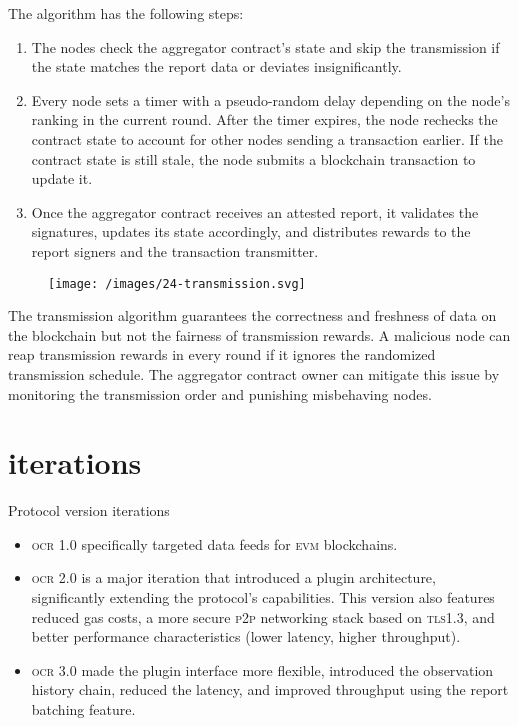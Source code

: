 \documentclass{article}
\begin{document}
The algorithm has the following steps:
\begin{enumerate}
    \item The nodes check the aggregator contract's state and skip the transmission if the state matches the report data or deviates insignificantly.
    \item Every node sets a timer with a pseudo-random delay depending on the node's ranking in the current round.
    After the timer expires, the node rechecks the contract state to account for other nodes sending a transaction earlier.
    If the contract state is still stale, the node submits a blockchain transaction to update it.
    \item Once the aggregator contract receives an attested report, it validates the signatures, updates its state accordingly, and distributes rewards to the report signers and the transaction transmitter.
\end{enumerate}
\begin{figure}[grayscale-diagram,medium-size]
\texttt{[image: /images/24-transmission.svg]}
\end{figure}

The transmission algorithm guarantees the correctness and freshness of data on the blockchain but not the fairness of transmission rewards.
A malicious node can reap transmission rewards in every round if it ignores the randomized transmission schedule.
The aggregator contract owner can mitigate this issue by monitoring the transmission order and punishing misbehaving nodes.

\section{iterations}{Protocol version iterations}
\begin{itemize}
    \item \textsc{ocr 1.0} specifically targeted data feeds for \textsc{evm} blockchains.
    \item \textsc{ocr 2.0} is a major iteration that introduced a plugin architecture, significantly extending the protocol's capabilities.
    This version also features reduced gas costs, a more secure \textsc{p2p} networking stack based on \textsc{tls1.3}, and better performance characteristics (lower latency, higher throughput).
    \item \textsc{ocr 3.0} made the plugin interface more flexible, introduced the observation history chain, reduced the latency, and improved throughput using the report batching feature.
\end{itemize}
\end{document}
